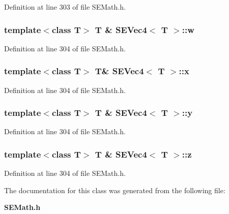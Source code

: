 Definition at line 303 of file S\+E\+Math.\+h.

\subsubsection[{w}]{\setlength{\rightskip}{0pt plus 5cm}template$<$class T$>$ T \& {\bf S\+E\+Vec4}$<$ T $>$\+::w}\label{class_s_e_vec4_a733a2a5c300d3cfbc1a1a84c554b684c}


Definition at line 304 of file S\+E\+Math.\+h.

\subsubsection[{x}]{\setlength{\rightskip}{0pt plus 5cm}template$<$class T$>$ T\& {\bf S\+E\+Vec4}$<$ T $>$\+::x}\label{class_s_e_vec4_a9a2c1b8f7b8ad599c95336b1cb4f2df9}


Definition at line 304 of file S\+E\+Math.\+h.

\subsubsection[{y}]{\setlength{\rightskip}{0pt plus 5cm}template$<$class T$>$ T \& {\bf S\+E\+Vec4}$<$ T $>$\+::y}\label{class_s_e_vec4_a21f57b7ea805e014985f9ecf67a6195d}


Definition at line 304 of file S\+E\+Math.\+h.

\subsubsection[{z}]{\setlength{\rightskip}{0pt plus 5cm}template$<$class T$>$ T \& {\bf S\+E\+Vec4}$<$ T $>$\+::z}\label{class_s_e_vec4_aeafd49b916c6bf33faedfb217005f70f}


Definition at line 304 of file S\+E\+Math.\+h.



The documentation for this class was generated from the following file\+:\begin{DoxyCompactItemize}
\item 
{\bf S\+E\+Math.\+h}\end{DoxyCompactItemize}
